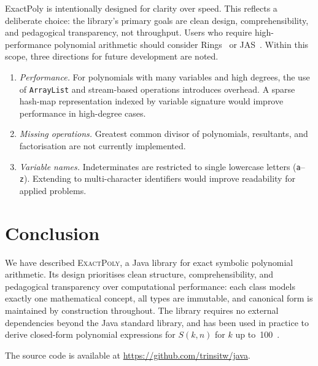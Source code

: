 \documentclass[11pt,a4paper]{article}
\begin{document}
ExactPoly is intentionally designed for clarity over speed.
This reflects a deliberate choice: the library's primary goals are clean
design, comprehensibility, and pedagogical transparency, not throughput.
Users who require high-performance polynomial arithmetic should consider
Rings~\cite{poslavsky2019} or JAS~\cite{kredel2008}.
Within this scope, three directions for future development are noted.

\begin{enumerate}[noitemsep]
  \item \textit{Performance.}
        For polynomials with many variables and high degrees, the use of
        \texttt{ArrayList} and stream-based operations introduces overhead.
        A sparse hash-map representation indexed by variable signature would
        improve performance in high-degree cases.

  \item \textit{Missing operations.}
        Greatest common divisor of polynomials, resultants, and factorisation
        are not currently implemented.

  \item \textit{Variable names.}
        Indeterminates are restricted to single lowercase letters
        (\texttt{a}--\texttt{z}).
        Extending to multi-character identifiers would improve readability
        for applied problems.
\end{enumerate}

\section{Conclusion}

We have described \textsc{ExactPoly}, a Java library for exact symbolic
polynomial arithmetic.
Its design prioritises clean structure, comprehensibility, and pedagogical
transparency over computational performance: each class models exactly one
mathematical concept, all types are immutable, and canonical form is maintained
by construction throughout.
The library requires no external dependencies beyond the Java standard library,
and has been used in practice to derive closed-form polynomial expressions for
$S(k,n)$ for $k$ up to~100~\cite{trinsit2026}.

The source code is available at \url{https://github.com/trinsitw/java}.

\end{document}
